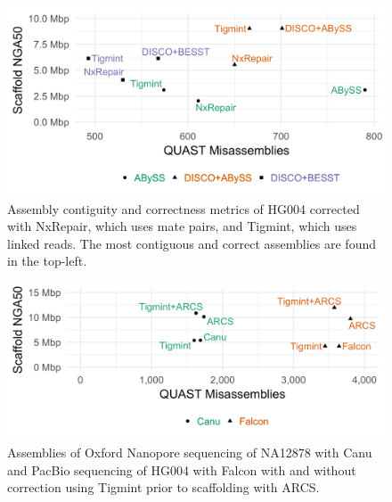 \documentclass[
  12pt,
  oneside,
  openany]{book}
\begin{document}
\begin{figure}
\hypertarget{fig:nxrepair}{%
\centering
\includegraphics{tigmint/nxrepair.png}
\caption[Assembly contiguity and correctness metrics of HG004 corrected with NxRepair, which uses mate pairs, and Tigmint, which uses linked reads.]{Assembly contiguity and correctness metrics of HG004 corrected with NxRepair, which uses mate pairs, and Tigmint, which uses linked reads. The most contiguous and correct assemblies are found in the top-left.}\label{fig:nxrepair}
}
\end{figure}

\begin{figure}
\hypertarget{fig:metrics-sms}{%
\centering
\includegraphics{tigmint/metrics-sms.png}
\caption[Assemblies of Oxford Nanopore sequencing of NA12878 with Canu and PacBio sequencing of HG004 with Falcon with and without correction using Tigmint prior to scaffolding with ARCS.]{Assemblies of Oxford Nanopore sequencing of NA12878 with Canu and PacBio sequencing of HG004 with Falcon with and without correction using Tigmint prior to scaffolding with ARCS.}\label{fig:metrics-sms}
}
\end{figure}
\end{document}
